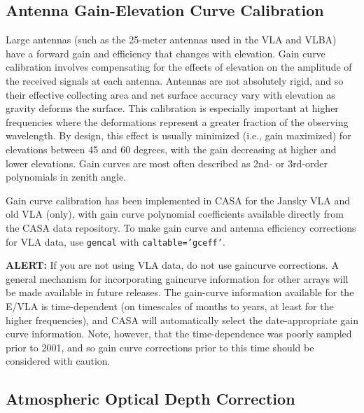 \subsection{Antenna Gain-Elevation Curve Calibration}
\label{section:cal.prior.curves}

Large antennas (such as the 25-meter antennas used
in the VLA and VLBA) have a forward gain and efficiency that changes with
elevation. Gain curve calibration involves compensating for the effects of
elevation on the amplitude of the received signals at each antenna.
Antennas are not absolutely rigid, and so their effective collecting
area and net surface accuracy vary with elevation as gravity deforms
the surface.  This calibration is especially important at higher
frequencies where the deformations represent a greater fraction of the
observing wavelength.  By design, this effect is usually minimized
(i.e., gain maximized) for elevations between 45 and 60 degrees, with
the gain decreasing at higher and lower elevations.  Gain curves are
most often described as 2nd- or 3rd-order polynomials in zenith angle.

Gain curve calibration has been implemented in CASA for the Jansky VLA
and old VLA (only), with gain curve polynomial coefficients available
directly from the CASA data repository.  To make gain curve and
antenna efficiency corrections for VLA data, use {\tt gencal} with
{\tt caltable='gceff'}. 


{\bf ALERT:} 
If you are not using VLA data, do not use gaincurve corrections.
A general mechanism for incorporating gaincurve information for
other arrays will be made available in future releases.
The gain-curve information available for the E/VLA is
time-dependent (on timescales of months to years, at least for the 
higher frequencies), and CASA will automatically select 
the date-appropriate gain curve information.  Note, however, that 
the time-dependence was poorly sampled prior to 2001, and so gain 
curve corrections prior to this time should be considered with caution.  


\subsection{Atmospheric Optical Depth Correction}
\label{section:cal.prior.opacity}

